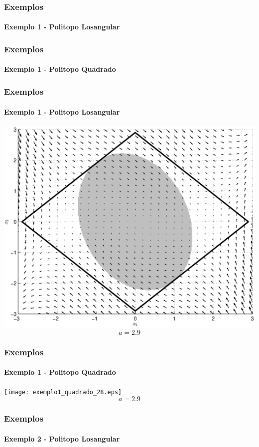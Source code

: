 \documentclass{beamer}
\begin{document}

\begin{frame}\frametitle{Exemplos}\framesubtitle{Exemplo 1 - Politopo Losangular}
  \centering
\end{frame}

\begin{frame}\frametitle{Exemplos}\framesubtitle{Exemplo 1 - Politopo Quadrado}
  \centering
\end{frame}

\begin{frame}\frametitle{Exemplos}\framesubtitle{Exemplo 1 - Politopo Losangular}
  \centering
  \includegraphics[height=0.7\textheight]{exemplo1_28.eps}
  \begin{equation}
    a = \num{2.9}
  \end{equation}
\end{frame}

\begin{frame}\frametitle{Exemplos}\framesubtitle{Exemplo 1 - Politopo Quadrado}
  \centering
  \texttt{[image: exemplo1\_quadrado\_28.eps]}
  \begin{equation}
    a = \num{2.9}
  \end{equation}
\end{frame}


\begin{frame}\frametitle{Exemplos}\framesubtitle{Exemplo 2 - Politopo Losangular}
  \centering
\end{frame}
\end{document}
